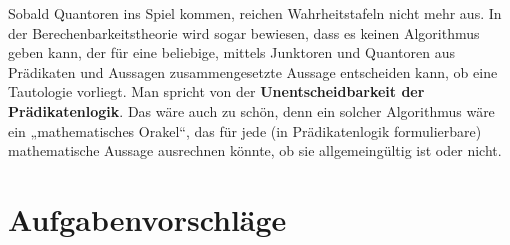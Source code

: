 \begin{vorschau}
    Sobald Quantoren ins Spiel kommen, reichen Wahrheitstafeln nicht mehr aus. In der Berechenbarkeitstheorie wird sogar bewiesen, dass es keinen Algorithmus geben kann, der für eine beliebige, mittels Junktoren und Quantoren aus Prädikaten und Aussagen zusammengesetzte Aussage entscheiden kann, ob eine Tautologie vorliegt. Man spricht von der \textbf{Unentscheidbarkeit der Prädikatenlogik}. Das wäre auch zu schön, denn ein solcher Algorithmus wäre ein „mathematisches Orakel“, das für jede (in Prädikatenlogik formulierbare) mathematische Aussage ausrechnen könnte, ob sie allgemeingültig ist oder nicht.%
\end{vorschau}





\clearpage
\section{Aufgabenvorschläge}


